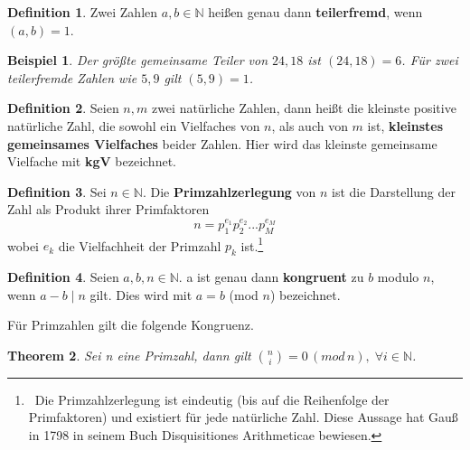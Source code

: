 \documentclass[12pt,oneside]{article}
\newtheorem{theorem}{Theorem}[section]
\newtheorem{example}[theorem]{Beispiel}
\theoremstyle{remark}
\theoremstyle{definition}
\newtheorem{definition}{Definition}[section]
\begin{document}
\smallskip


\begin{definition}\label{Df_2}
Zwei Zahlen $a,b \in \mathbb{N}$ heißen genau dann \textbf{teilerfremd}, wenn $(a,b) = 1$.
\end{definition}

\begin{example}
Der größte gemeinsame Teiler von $24,18$ ist $(24,18) = 6$. Für zwei teilerfremde Zahlen wie $5,9$ gilt $(5,9) = 1$. 
\end{example}

\smallskip 



\smallskip

\begin{definition}
Seien $n, m$ zwei natürliche Zahlen, dann heißt die kleinste positive natürliche Zahl, die sowohl ein Vielfaches von $n$, als auch von $m$ ist, \textbf{kleinstes gemeinsames Vielfaches} beider Zahlen. Hier wird das kleinste gemeinsame Vielfache mit \textbf{kgV} bezeichnet.
\end{definition}

\smallskip

\begin{definition}\label{Df_5}
Sei $n \in \mathbb{N}$. Die \textbf{Primzahlzerlegung} von $n$ ist die Darstellung der Zahl als Produkt ihrer Primfaktoren \newline
\begin{equation}
    n = p_{1}^{e_{1}}p_{2}^{e_{2}}...p_{M}^{e_{M}}
\end{equation}
wobei $e_{k}$ die Vielfachheit der Primzahl $p_{k}$ ist.\footnote{$\,$ Die Primzahlzerlegung ist eindeutig (bis auf die Reihenfolge der Primfaktoren) und existiert für jede natürliche Zahl. Diese Aussage hat Gauß in 1798 in seinem Buch Disquisitiones Arithmeticae bewiesen\cite{gau-book}.}
\end{definition}


\begin{definition}\label{Df_3}
Seien $a, b, n \in \mathbb{N}$. a ist genau dann \textbf{kongruent} zu $b$ modulo $n$, wenn $a - b \mid n$ gilt. Dies wird mit $a = b$ (mod $n$) bezeichnet.  
\end{definition}

Für Primzahlen gilt die folgende Kongruenz.

\begin{theorem}\label{th_25}
Sei n eine Primzahl, dann gilt ${n \choose i} = 0 \, ( mod \, n), \; \forall i \in \mathbb{N}$.
\end{theorem}
\end{document}

